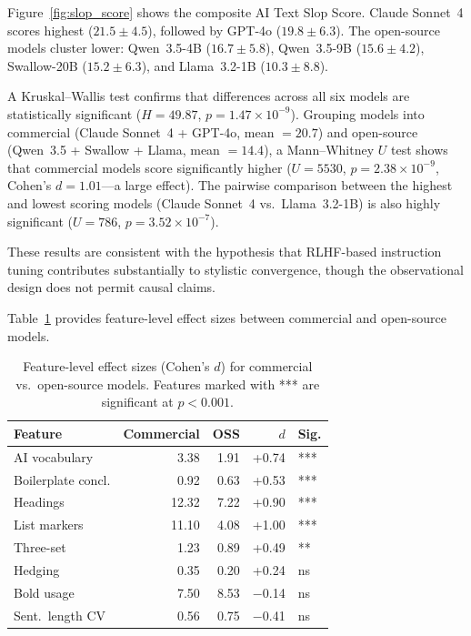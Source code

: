 \documentclass[11pt,a4paper]{article}
\begin{document}
Figure~\ref{fig:slop_score} shows the composite AI Text Slop Score. Claude Sonnet~4 scores highest ($21.5 \pm 4.5$), followed by GPT-4o ($19.8 \pm 6.3$). The open-source models cluster lower: Qwen~3.5-4B ($16.7 \pm 5.8$), Qwen~3.5-9B ($15.6 \pm 4.2$), Swallow-20B ($15.2 \pm 6.3$), and Llama~3.2-1B ($10.3 \pm 8.8$).

A Kruskal--Wallis test confirms that differences across all six models are statistically significant ($H = 49.87$, $p = 1.47 \times 10^{-9}$). Grouping models into commercial (Claude Sonnet~4 + GPT-4o, mean $= 20.7$) and open-source (Qwen~3.5 + Swallow + Llama, mean $= 14.4$), a Mann--Whitney $U$ test shows that commercial models score significantly higher ($U = 5530$, $p = 2.38 \times 10^{-9}$, Cohen's $d = 1.01$---a large effect). The pairwise comparison between the highest and lowest scoring models (Claude Sonnet~4 vs.\ Llama~3.2-1B) is also highly significant ($U = 786$, $p = 3.52 \times 10^{-7}$).

These results are consistent with the hypothesis that RLHF-based instruction tuning contributes substantially to stylistic convergence, though the observational design does not permit causal claims.

Table~\ref{tab:feature_effects} provides feature-level effect sizes between commercial and open-source models.

\begin{table}[H]
\centering
\caption{Feature-level effect sizes (Cohen's $d$) for commercial vs.\ open-source models. Features marked with *** are significant at $p < 0.001$.}
\label{tab:feature_effects}
\small
\begin{tabular}{lrrrl}
\toprule
\textbf{Feature} & \textbf{Commercial} & \textbf{OSS} & \textbf{$d$} & \textbf{Sig.} \\
\midrule
AI vocabulary & 3.38 & 1.91 & +0.74 & *** \\
Boilerplate concl. & 0.92 & 0.63 & +0.53 & *** \\
Headings & 12.32 & 7.22 & +0.90 & *** \\
List markers & 11.10 & 4.08 & +1.00 & *** \\
Three-set & 1.23 & 0.89 & +0.49 & ** \\
Hedging & 0.35 & 0.20 & +0.24 & ns \\
Bold usage & 7.50 & 8.53 & $-$0.14 & ns \\
Sent.\ length CV & 0.56 & 0.75 & $-$0.41 & ns \\
\bottomrule
\end{tabular}
\end{table}
\end{document}
